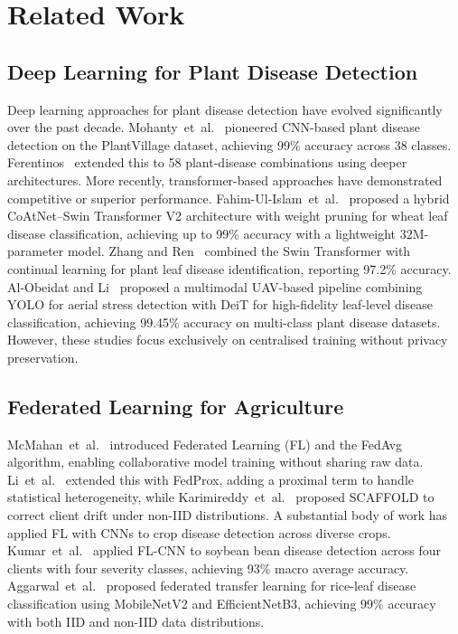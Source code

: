 \documentclass[conference]{IEEEtran}
\begin{document}
\section{Related Work}
\label{sec:related}

\subsection{Deep Learning for Plant Disease Detection}

Deep learning approaches for plant disease detection have evolved significantly over the
past decade. Mohanty~et~al.~\cite{Mohanty2016} pioneered CNN-based plant disease
detection on the PlantVillage dataset, achieving 99\% accuracy across 38 classes.
Ferentinos~\cite{Ferentinos2018} extended this to 58 plant-disease combinations using
deeper architectures. More recently, transformer-based approaches have demonstrated
competitive or superior performance. Fahim-Ul-Islam~et~al.~\cite{FahimUlIslam2024}
proposed a hybrid CoAtNet--Swin Transformer V2 architecture with weight pruning for
wheat leaf disease classification, achieving up to 99\% accuracy with a lightweight
32M-parameter model. Zhang and Ren~\cite{Zhang2025} combined the Swin Transformer with
continual learning for plant leaf disease identification, reporting 97.2\% accuracy.
Al-Obeidat and Li~\cite{AlObeidat2025} proposed a multimodal UAV-based pipeline
combining YOLO for aerial stress detection with DeiT for high-fidelity leaf-level
disease classification, achieving 99.45\% accuracy on multi-class plant disease datasets. However, these studies focus exclusively on centralised training without
privacy preservation.

\subsection{Federated Learning for Agriculture}

McMahan~et~al.~\cite{McMahan2017} introduced Federated Learning (FL) and the FedAvg
algorithm, enabling collaborative model training without sharing raw data.
Li~et~al.~\cite{Li2020} extended this with FedProx, adding a proximal term to handle
statistical heterogeneity, while Karimireddy~et~al.~\cite{Karimireddy2020} proposed
SCAFFOLD to correct client drift under non-IID distributions. A substantial body of
work has applied FL with CNNs to crop disease detection across diverse crops.
Kumar~et~al.~\cite{Kumar2024} applied FL-CNN to soybean bean disease detection across
four clients with four severity classes, achieving 93\% macro average accuracy.
Aggarwal~et~al.~\cite{Aggarwal2023} proposed federated transfer learning for rice-leaf
disease classification using MobileNetV2 and EfficientNetB3, achieving 99\% accuracy
with both IID and non-IID data distributions.
\end{document}
